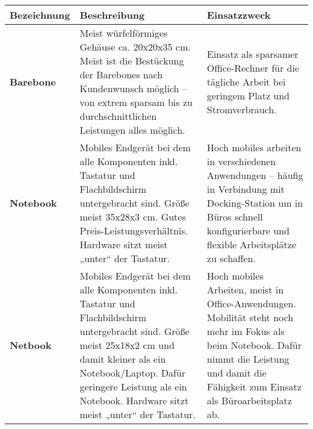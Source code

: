 \documentclass[asp1.tex]{subfiles}
\begin{document}
\begin{longtable}{|p{}|p{}|p{}|}

    \hline
    \textbf{Bezeichnung}       & \textbf{Beschreibung}                                                                                                                                                                                                                                                                                                            & \textbf{Einsatzzweck}                                                                                                                                                                                                                                     \\\hline
    \textbf{Barebone}          & Meist würfelförmiges Gehäuse ca. 20x20x35 cm.
    Meist ist die Bestückung der Barebones nach Kundenwunsch
    möglich – von extrem sparsam bis zu durchschnittlichen
    Leistungen alles möglich.  & Einsatz als sparsamer Office-Rechner für die tägliche Arbeit bei geringem Platz und Stromverbrauch.                                                                                                                                                                                                                                                                                                                                                                                                                                                                                          \\\hline

    \textbf{Notebook}          & Mobiles Endgerät bei dem alle Komponenten inkl. Tastatur und Flachbildschirm untergebracht sind. Größe meist 35x28x3 cm. \newline Gutes Preis-Leistungsverhältnis. \newline Hardware sitzt meist „unter“ der Tastatur.                                                                                                           & Hoch mobiles arbeiten in verschiedenen Anwendungen – häufig in Verbindung mit Docking-Station um in Büros schnell konfigurierbare und flexible Arbeitsplätze zu schaffen.                                                                                 \\\hline

    \textbf{Netbook}           & Mobiles Endgerät bei dem alle Komponenten inkl. Tastatur und Flachbildschirm untergebracht sind. Größe meist 25x18x2 cm und damit kleiner als ein Notebook/Laptop. Dafür geringere Leistung als ein Notebook. \newline Hardware sitzt meist „unter“ der Tastatur.                                                                & Hoch mobiles Arbeiten, meist in Office-Anwendungen. Mobilität steht noch mehr im Fokus als beim Notebook. Dafür nimmt die Leistung und damit die Fähigkeit zum Einsatz als Büroarbeitsplatz ab.                                                           \\\hline


\end{longtable}
\end{document}
